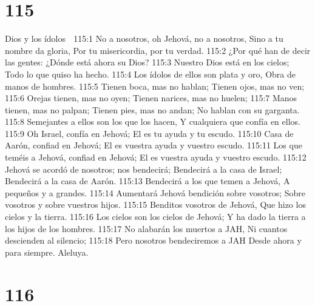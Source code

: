 \chapter{115}

Dios y los ídolos 

115:1 No a nosotros, oh Jehová, no a nosotros, 
Sino a tu nombre da gloria, 
Por tu misericordia, por tu verdad. 
115:2 ¿Por qué han de decir las gentes: 
¿Dónde está ahora su Dios? 
115:3 Nuestro Dios está en los cielos; 
Todo lo que quiso ha hecho. 
115:4 Los ídolos de ellos son plata y oro, 
Obra de manos de hombres. 
115:5 Tienen boca, mas no hablan; 
Tienen ojos, mas no ven; 
115:6 Orejas tienen, mas no oyen; 
Tienen narices, mas no huelen; 
115:7 Manos tienen, mas no palpan; 
Tienen pies, mas no andan; 
No hablan con su garganta. 
115:8 Semejantes a ellos son los que los hacen, 
Y cualquiera que confía en ellos. 
115:9 Oh Israel, confía en Jehová; 
El es tu ayuda y tu escudo. 
115:10 Casa de Aarón, confiad en Jehová; 
El es vuestra ayuda y vuestro escudo. 
115:11 Los que teméis a Jehová, confiad en Jehová; 
El es vuestra ayuda y vuestro escudo. 
115:12 Jehová se acordó de nosotros; nos bendecirá; 
Bendecirá a la casa de Israel; 
Bendecirá a la casa de Aarón. 
115:13 Bendecirá a los que temen a Jehová, 
A pequeños y a grandes. 
115:14 Aumentará Jehová bendición sobre vosotros; 
Sobre vosotros y sobre vuestros hijos. 
115:15 Benditos vosotros de Jehová, 
Que hizo los cielos y la tierra. 
115:16 Los cielos son los cielos de Jehová; 
Y ha dado la tierra a los hijos de los hombres. 
115:17 No alabarán los muertos a JAH, 
Ni cuantos descienden al silencio; 
115:18 Pero nosotros bendeciremos a JAH 
Desde ahora y para siempre. 
Aleluya. 

\chapter{116}

